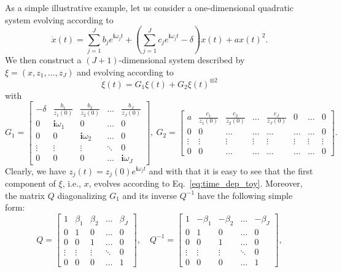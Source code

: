 \documentclass[superscriptaddress,onecolumn,nofootinbib,longbibliography,a4paper,accepted=2026-09-29]{quantumarticle}
\theoremstyle{plain}
\theoremstyle{definition}
\numberwithin{thm}{section}
\numberwithin{assumption}{section}
\numberwithin{lemma}{section}
\numberwithin{prop}{section}
\numberwithin{cor}{section}
\numberwithin{definition}{section}
\numberwithin{rmk}{section}
\numberwithin{equation}{section}
\newcommand{\ot}{\otimes}
\renewcommand{\i}{\ensuremath{\mathbf{i}}}
\begin{document}
As a simple illustrative example, let us consider a one-dimensional quadratic system evolving according to
\begin{equation}
    \label{eq:time_dep_toy}
    \dot{x}(t)=\sum_{j=1}^J b_j e^{\i \omega_j t}+\left(\sum_{j=1}^J c_j e^{\i \omega_j t} -{\delta}\right) x(t) + a x(t)^2.
\end{equation}
We then construct a $(J+1)$-dimensional system described by $\xi=(x,z_1,\dots,z_J)$ and evolving according to 
\begin{equation}
    \label{eq:xi_evol}
     \dot{\xi}(t)= G_1 \xi(t) + G_2 \xi(t)^{\ot 2}
\end{equation}
with
\begin{equation}
\!\!\!\!\! G_1 = \begin{bmatrix}
        -{\delta} &\frac{b_1}{z_1(0)} & \frac{b_2}{z_2(0)} & \dots &\frac{b_J}{z_J(0)}\\
        0 & \i\omega_1 & 0 & \dots & 0\\
        0 & 0 & \i\omega_2 & \dots & 0\\
        \vdots &\vdots &\vdots &\ddots & 0\\
        0 & 0& 0 & \dots & \i\omega_J
    \end{bmatrix}\! ,
    ~
    G_2 = \begin{bmatrix}
        a & \frac{c_1}{z_1(0)} & \frac{c_2}{z_2(0)} &\dots  & \frac{c_J}{z_J(0)} & 0 &\dots & 0\\
        0 & 0 & \dots & \dots & \dots & \dots & \dots &0 \\
        \vdots & \vdots & \vdots & \vdots & \vdots & \vdots & \vdots &\vdots \\
        0 & 0 & \dots & \dots & \dots & \dots & \dots &0 
    \end{bmatrix}\! .\!
\end{equation}
Clearly, we have $z_j(t)=z_j(0)e^{\i \omega_j t}$ and with that it is easy to see that the first component of $\xi$, i.e., $x$, evolves according to Eq.~\eqref{eq:time_dep_toy}. Moreover, the matrix $Q$ diagonalizing $G_1$ and its inverse $Q^{-1}$ have the following simple form:
\begin{equation}
Q = \begin{bmatrix}
        1 & \beta_1 & \beta_2 & \dots &\beta_J\\
        0 & 1 & 0 & \dots & 0\\
        0 & 0 & 1 & \dots & 0\\
        \vdots &\vdots &\vdots &\ddots & 0\\
        0 & 0& 0 & \dots &1
    \end{bmatrix} ,
    \quad
    Q^{-1} = \begin{bmatrix}
        1 & -\beta_1 & -\beta_2 & \dots &-\beta_J\\
        0 & 1 & 0 & \dots & 0\\
        0 & 0 & 1 & \dots & 0\\
        \vdots &\vdots &\vdots &\ddots & 0\\
        0 & 0& 0 & \dots &1
    \end{bmatrix},
\end{equation}
\end{document}
